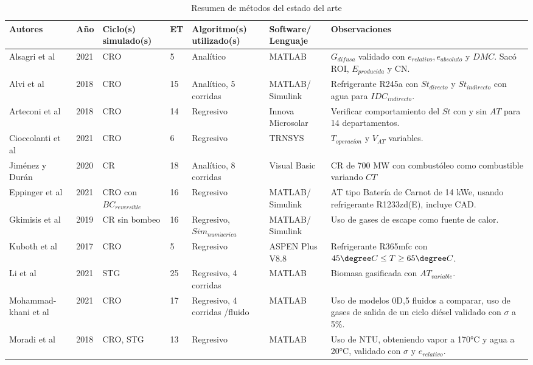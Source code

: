 {\parindent0pt \singlespace
\begin{footnotesize}
    
\begin{longtable}[H]{p{1.5cm}p{0.5cm}p{1.6cm}p{0.4cm}p{1.7cm}p{1.6cm}p{6.5cm}}
    \caption{Resumen de métodos del estado del arte}
    \label{tab:tedoarte} \\
    \hline 
    Autores & Año & Ciclo(s) simulado(s) & ET & Algoritmo(s) utilizado(s) & Software/ Lenguaje & Observaciones \\
    \hline
    Alsagri et al & 2021 & CRO & 5 & Analítico & MATLAB  & $G_{difusa}$ validado con $e_{relativo},e_{absoluto}$ y $DMC$. Sacó ROI, $E_{producida}$ y CN. \\
    Alvi et al & 2018 & CRO & 15 & Analítico, 5 corridas & MATLAB/ Simulink & Refrigerante R245a con $St_{directo}$ y $St_{indirecto}$ con agua para $IDC_{indirecto}$. \\
    Arteconi et al & 2018 & CRO & 14 & Regresivo & Innova Microsolar & Verificar comportamiento del $St$ con y sin $AT$ para 14 departamentos. \\
    Cioccolanti et al & 2021 & CRO & 6 & Regresivo & TRNSYS & $T_{operaci\acute{o}n}$ y $V_{AT}$ variables. \\
    Jiménez y Durán & 2020 & CR & 18 & Analítico, 8 corridas & Visual Basic & CR de 700 MW con combustóleo como combustible variando $CT$ \\
    Eppinger et al & 2021 & CRO con $BC_{reversible}$& 16 & Regresivo &  MATLAB/ Simulink & AT tipo Batería de Carnot de 14 kWe, usando refrigerante R1233zd(E), incluye CAD. \\
    Gkimisis et al & 2019 & CR sin bombeo & 16 & Regresivo, $Sim_{num\acute{u}erica}$ &  MATLAB/ Simulink & Uso de gases de escape como fuente de calor. \\
    Kuboth et al & 2017 & CRO & 5 & Regresivo & ASPEN Plus V8.8 & Refrigerante R365mfc con $45\degree C \leq T \geq 65 \degree C $. \\
    Li et al & 2021 & STG & 25 & Regresivo, 4 corridas & MATLAB & Biomasa gasificada con $AT_{variable}$. \\
    Mohammad- khani et al & 2021 & CRO & 17 & Regresivo, 4 corridas /fluido & MATLAB & Uso de modelos 0D,5 fluidos a comparar, uso de gases de salida de un ciclo diésel validado con $\sigma$ a 5\%. \\
    Moradi et al & 2018 & CRO, STG & 13 & Regresivo & MATLAB & Uso de NTU, obteniendo vapor a 170°C y agua a 20°C, validado con $\sigma$ y $e_{relativo}$. \\

\end{longtable}
\end{footnotesize}}
